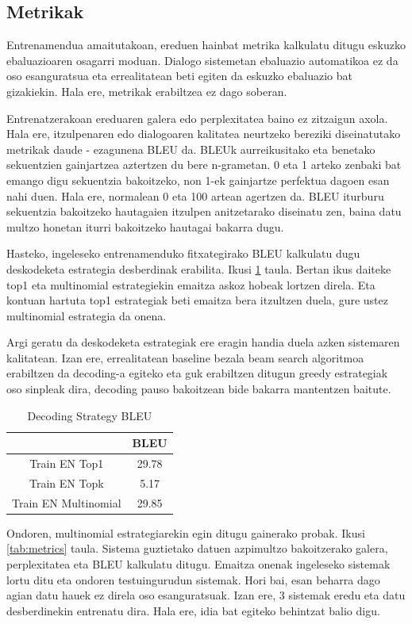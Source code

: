 \documentclass[11pt,a4paper]{article}
\begin{document}
\subsection{Metrikak}

Entrenamendua amaitutakoan, ereduen hainbat metrika kalkulatu ditugu eskuzko ebaluazioaren osagarri moduan. Dialogo sistemetan ebaluazio automatikoa ez da oso esanguratsua eta errealitatean beti egiten da eskuzko ebaluazio bat gizakiekin. Hala ere, metrikak erabiltzea ez dago soberan.

Entrenatzerakoan ereduaren galera edo perplexitatea baino ez zitzaigun axola. Hala ere, itzulpenaren edo dialogoaren kalitatea neurtzeko bereziki diseinatutako metrikak daude - ezagunena BLEU da. BLEUk aurreikusitako eta benetako sekuentzien gainjartzea aztertzen du bere n-grametan. 0 eta 1 arteko zenbaki bat emango digu sekuentzia bakoitzeko, non 1-ek gainjartze perfektua dagoen esan nahi duen. Hala ere, normalean 0 eta 100 artean agertzen da. BLEU iturburu sekuentzia bakoitzeko hautagaien itzulpen anitzetarako diseinatu zen, baina datu multzo honetan iturri bakoitzeko hautagai bakarra dugu.

Hasteko, ingeleseko entrenamenduko fitxategirako BLEU kalkulatu dugu deskodeketa estrategia desberdinak erabilita. Ikusi \ref{tab:decoding} taula. Bertan ikus daiteke top1 eta multinomial estrategiekin emaitza askoz hobeak lortzen direla. Eta kontuan hartuta top1 estrategiak beti emaitza bera itzultzen duela, gure ustez multinomial estrategia da onena.

Argi geratu da deskodeketa estrategiak ere eragin handia duela azken sistemaren kalitatean. Izan ere, errealitatean baseline bezala beam search algoritmoa erabiltzen da decoding-a egiteko eta guk erabiltzen ditugun greedy estrategiak oso sinpleak dira, decoding pauso bakoitzean bide bakarra mantentzen baitute.

\begin{table}
\centering
\begin{tabular}{ |c|c| } 
    \hline
    & BLEU \\
    \hline
    Train EN Top1 & 29.78 \\ 
    Train EN Topk & 5.17 \\ 
    Train EN Multinomial & 29.85 \\ 
    \hline
\end{tabular}
\caption{Decoding Strategy BLEU}
\label{tab:decoding}
\end{table}

Ondoren, multinomial estrategiarekin egin ditugu gainerako probak. Ikusi \ref{tab:metrics} taula. Sistema guztietako datuen azpimultzo bakoitzerako galera, perplexitatea eta BLEU kalkulatu ditugu. Emaitza onenak ingeleseko sistemak lortu ditu eta ondoren testuingurudun sistemak. Hori bai, esan beharra dago agian datu hauek ez direla oso esanguratsuak. Izan ere, 3 sistemak eredu eta datu desberdinekin entrenatu dira. Hala ere, idia bat egiteko behintzat balio digu.
\end{document}
